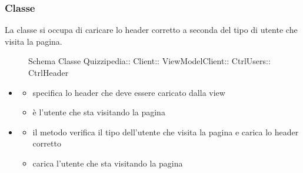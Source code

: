 \subsubsection{Classe }
La classe si occupa di caricare lo header corretto a seconda del tipo di utente che visita la pagina.
\begin{figure}[H]
\centering
\noindent{}
\caption[Schema Classe CtrlHeader]{Schema Classe Quizzipedia:: Client:: ViewModelClient:: CtrlUsers:: CtrlHeader}
\end{figure}
\begin{itemize}
\item {}
\begin{itemize}
\item {}
\newline
specifica lo header che deve essere caricato dalla view
\item {}
\newline
è l'utente che sta visitando la pagina
\end{itemize}
\item {}
\begin{itemize}
\item {}
\newline
il metodo verifica il tipo dell'utente che visita la pagina e carica lo header corretto
\newline
\item {}
\newline
carica l'utente che sta visitando la pagina
\newline
\end{itemize}
\end{itemize}
